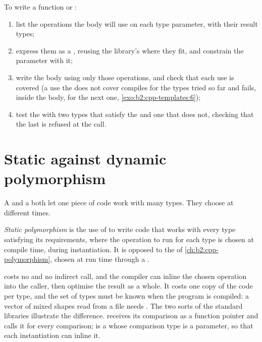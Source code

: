 \begin{method}\label{met:b2:cpp-templates:concept-first}
To write a function or :
\begin{enumerate}
\item list the operations the body will use on each type parameter, with their result types;
\item express them as a , reusing the library's  where they fit, and constrain the parameter with it;
\item write the body using only those operations, and check that each use is covered (a use the  does not
cover compiles for the types tried so far and fails, inside the body, for the next one,
\cref{exo:b2:cpp-templates:6});
\item test the  with two types that satisfy the  and one that does not, checking that the last is
refused at the call.
\end{enumerate}
\end{method}

\section{Static against dynamic polymorphism}\label{sec:b2:cpp-templates:static}

A  and a  both let one piece of code work with many types. They choose at different
times.

\begin{definition}\label{def:b2:cpp-templates:static-poly}
\emph{Static polymorphism} is the use of  to write code that works with every
type satisfying its requirements, where the operation to run for each type is chosen at compile time, during
instantiation. It is opposed to the  of \cref{ch:b2:cpp-polymorphism}, chosen at run time
through a .
\end{definition}

 costs no  and no indirect call, and the compiler can inline the chosen operation
into the caller, then optimise the result as a whole. It costs one copy of the code per type, and the set of types
must be known when the program is compiled: a vector of mixed shapes read from a file needs . The
two sorts of the standard libraries illustrate the difference.  receives its comparison as a function
pointer and calls it for every comparison;  is a  whose comparison type is a parameter, so
that each instantiation can inline it.

